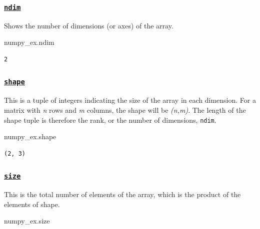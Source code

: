 \documentclass[
  letterpaper,
  DIV=11,
  numbers=noendperiod]{scrreprt}
\newenvironment{Shaded}{\begin{snugshade}}{\end{snugshade}}
\newcommand{\NormalTok}[1]{\textcolor[rgb]{0.00,0.23,0.31}{#1}}
\begin{document}
\hypertarget{ndim}{%
\subsubsection{\texorpdfstring{\href{https://numpy.org/doc/stable/reference/generated/numpy.ndarray.ndim.html}{\texttt{ndim}}}{ndim}}\label{ndim}}

Shows the number of dimensions (or axes) of the array.

\begin{Shaded}
\begin{Highlighting}[]
\NormalTok{numpy\_ex.ndim}
\end{Highlighting}
\end{Shaded}

\begin{verbatim}
2
\end{verbatim}

\hypertarget{shape}{%
\subsubsection{\texorpdfstring{\href{https://numpy.org/doc/stable/reference/generated/numpy.ndarray.shape.html}{\texttt{shape}}}{shape}}\label{shape}}

This is a tuple of integers indicating the size of the array in each
dimension. For a matrix with \emph{n} rows and \emph{m} columns, the
shape will be \emph{(n,m)}. The length of the shape tuple is therefore
the rank, or the number of dimensions, \texttt{ndim}.

\begin{Shaded}
\begin{Highlighting}[]
\NormalTok{numpy\_ex.shape}
\end{Highlighting}
\end{Shaded}

\begin{verbatim}
(2, 3)
\end{verbatim}

\hypertarget{size}{%
\subsubsection{\texorpdfstring{\href{https://numpy.org/doc/stable/reference/generated/numpy.ndarray.size.html}{\texttt{size}}}{size}}\label{size}}

This is the total number of elements of the array, which is the product
of the elements of shape.

\begin{Shaded}
\begin{Highlighting}[]
\NormalTok{numpy\_ex.size}
\end{Highlighting}
\end{Shaded}
\end{document}
